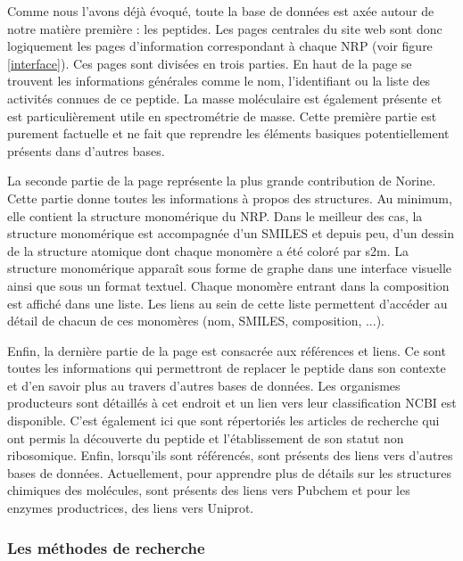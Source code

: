 Comme nous l'avons déjà évoqué, toute la base de données est axée autour de notre matière première : les peptides.
Les pages centrales du site web sont donc logiquement les pages d'information correspondant à chaque NRP (voir figure \ref{interface}).
Ces pages sont divisées en trois parties.
En haut de la page se trouvent les informations générales comme le nom, l'identifiant ou la liste des activités connues de ce peptide.
La masse moléculaire est également présente et est particulièrement utile en spectrométrie de masse.
Cette première partie est purement factuelle et ne fait que reprendre les éléments basiques potentiellement présents dans d'autres bases.

La seconde partie de la page représente la plus grande contribution de Norine.
Cette partie donne toutes les informations à propos des structures.
Au minimum, elle contient la structure monomérique du NRP.
Dans le meilleur des cas, la structure monomérique est accompagnée d'un SMILES et depuis peu, d'un dessin de la structure atomique dont chaque monomère a été coloré par s2m.
La structure monomérique apparaît sous forme de graphe dans une interface visuelle ainsi que sous un format textuel.
Chaque monomère entrant dans la composition est affiché dans une liste.
Les liens au sein de cette liste permettent d'accéder au détail de chacun de ces monomères (nom, SMILES, composition, ...).

Enfin, la dernière partie de la page est consacrée aux références et liens.
Ce sont toutes les informations qui permettront de replacer le peptide dans son contexte et d'en savoir plus au travers d'autres bases de données.
Les organismes producteurs sont détaillés à cet endroit et un lien vers leur classification NCBI est disponible.
C'est également ici que sont répertoriés les articles de recherche qui ont permis la découverte du peptide et l'établissement de son statut non ribosomique.
Enfin, lorsqu'ils sont référencés, sont présents des liens vers d'autres bases de données.
Actuellement, pour apprendre plus de détails sur les structures chimiques des molécules, sont présents des liens vers Pubchem et pour les enzymes productrices, des liens vers Uniprot.


\subsubsection{Les méthodes de recherche}

